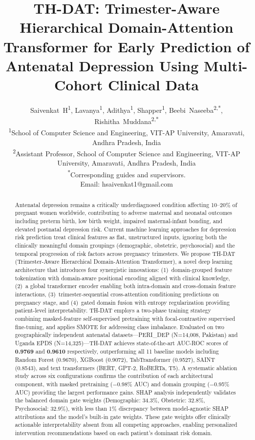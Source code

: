 \documentclass[12pt,a4paper]{article}
\title{\textbf{TH-DAT: Trimester-Aware Hierarchical Domain-Attention Transformer for Early Prediction of Antenatal Depression Using Multi-Cohort Clinical Data}}
\author{
Saivenkat~H\textsuperscript{1}, Lavanya\textsuperscript{1}, Adithya\textsuperscript{1}, Shapper\textsuperscript{1}, Beebi~Naseeba\textsuperscript{2,*}, Rishitha~Muddana\textsuperscript{2,*} \\[6pt]
\textsuperscript{1}School of Computer Science and Engineering, VIT-AP University, Amaravati, Andhra Pradesh, India \\
\textsuperscript{2}Assistant Professor, School of Computer Science and Engineering, VIT-AP University, Amaravati, Andhra Pradesh, India \\[6pt]
\textsuperscript{*}Corresponding guides and supervisors. \\
Email: hsaivenkat1@gmail.com
}
\date{}
\begin{document}
\maketitle

\begin{abstract}
\noindent
Antenatal depression remains a critically underdiagnosed condition affecting 10--20\% of pregnant women worldwide, contributing to adverse maternal and neonatal outcomes including preterm birth, low birth weight, impaired maternal-infant bonding, and elevated postnatal depression risk. Current machine learning approaches for depression risk prediction treat clinical features as flat, unstructured inputs, ignoring both the clinically meaningful domain groupings (demographic, obstetric, psychosocial) and the temporal progression of risk factors across pregnancy trimesters. We propose TH-DAT (Trimester-Aware Hierarchical Domain-Attention Transformer), a novel deep learning architecture that introduces four synergistic innovations: (1)~domain-grouped feature tokenization with domain-aware positional encoding aligned with clinical knowledge, (2)~a global transformer encoder enabling both intra-domain and cross-domain feature interactions, (3)~trimester-sequential cross-attention conditioning predictions on pregnancy stage, and (4)~gated domain fusion with entropy regularization providing patient-level interpretability. TH-DAT employs a two-phase training strategy combining masked-feature self-supervised pretraining with focal-contrastive supervised fine-tuning, and applies SMOTE for addressing class imbalance. Evaluated on two geographically independent antenatal datasets---PERI\_DEP (N=14,008, Pakistan) and Uganda EPDS (N=14,325)---TH-DAT achieves state-of-the-art AUC-ROC scores of \textbf{0.9769} and \textbf{0.9610} respectively, outperforming all 11 baseline models including Random Forest (0.9670), XGBoost (0.9072), TabTransformer (0.9527), SAINT (0.8543), and text transformers (BERT, GPT-2, RoBERTa, T5). A systematic ablation study across six configurations confirms the contribution of each architectural component, with masked pretraining ($-$0.98\% AUC) and domain grouping ($-$0.95\% AUC) providing the largest performance gains. SHAP analysis independently validates the balanced domain gate weights (Demographic: 34.3\%, Obstetric: 32.8\%, Psychosocial: 32.9\%), with less than 1\% discrepancy between model-agnostic SHAP attributions and the model's built-in gate weights. These gate weights offer clinically actionable interpretability absent from all competing approaches, enabling personalized intervention recommendations based on each patient's dominant risk domain.
\end{abstract}
\end{document}

